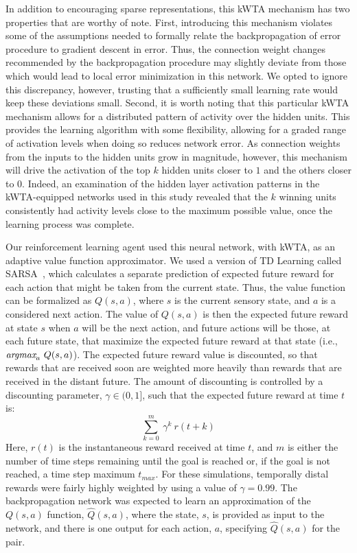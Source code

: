 \documentclass[preprint,12pt,authoryear]{elsarticle}
\begin{document}
In addition to encouraging sparse representations, this kWTA mechanism
has two properties that are worthy of note. First, introducing this
mechanism violates some of the assumptions needed to formally relate
the backpropagation of error procedure to gradient descent in
error. Thus, the connection weight changes recommended by the
backpropagation procedure may slightly deviate from those which would
lead to local error minimization in this network. We opted to ignore
this discrepancy, however, trusting that a sufficiently small learning
rate would keep these deviations small. Second, it is worth noting
that this particular kWTA mechanism allows for a distributed pattern
of activity over the hidden units. This provides the learning
algorithm with some flexibility, allowing for a graded range of
activation levels when doing so reduces network error. As connection
weights from the inputs to the hidden units grow in magnitude,
however, this mechanism will drive the activation of the top $k$
hidden units closer to $1$ and the others closer to $0$. Indeed, an
examination of the hidden layer activation patterns in the
kWTA-equipped networks used in this study revealed that the $k$
winning units consistently had activity levels close to the maximum
possible value, once the learning process was complete.

Our reinforcement learning agent used this neural network, with kWTA,
as an adaptive value function approximator. We used a version of TD
Learning called SARSA~\citep{SuttonRS:1998:Book}, which calculates a
separate prediction of expected future reward for each action that
might be taken from the current state. Thus, the value function can be
formalized as $Q(s,a)$, where $s$ is the current sensory state,
and $a$ is a considered next action. The value of $Q(s,a)$ is then the expected future reward at
state $s$ when $a$ will be the next action, and future actions will be
those, at each future state, that maximize the expected future reward
at that state (i.e., $\mbox{\it argmax}_{a}\ Q(s,a)$). The expected
future reward value is discounted, so that rewards that are received
soon are weighted more heavily than rewards that are received in the
distant future. The amount of discounting is controlled by a
discounting parameter, $\gamma \in (0,1]$, such that the expected
  future reward at time $t$ is:
\[ \sum_{k=0}^{m} \ \gamma^{k} \ r(t+k) \]
Here, $r(t)$ is the instantaneous reward received at time $t$, and $m$ is either the number of time steps
remaining until the goal is reached or, if the goal is not reached,
a time step maximum $t_{max}$. For these
simulations, temporally distal rewards were fairly highly weighted by
using a value of $\gamma = 0.99$. The backpropagation network was
expected to learn an approximation of the $Q(s,a)$ function,
$\hat{Q}(s,a)$, where the state, $s$, is provided as input to the
network, and there is one output for each action, $a$, specifying
$\hat{Q}(s,a)$ for the pair.
\end{document}
